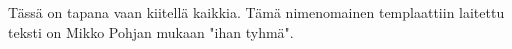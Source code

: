 Tässä on tapana vaan kiitellä kaikkia. Tämä nimenomainen templaattiin laitettu teksti on Mikko Pohjan mukaan "ihan tyhmä".
 
\newpage
\tableofcontents

%  
%  
%  
 
 
\newpage
\renewcommand{\chaptermark}[1]{\markboth{\thechapter. \ #1}{}}
\renewcommand{\sectionmark}[1]{\markright{}{}}
\lhead{\fancyplain{}{\leftmark}}
 
